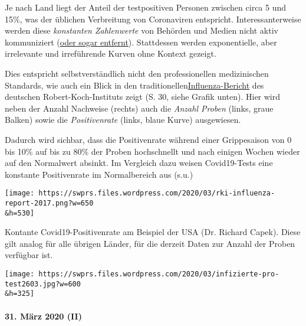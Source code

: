 Je nach Land liegt der Anteil der testpositiven Personen zwischen circa
5 und 15\%, was der üblichen Verbreitung von Coronaviren entspricht.
Interessanterweise werden diese \emph{konstanten Zahlenwerte} von
Behörden und Medien nicht aktiv kommuniziert
(\href{https://multipolar-magazin.de/artikel/coronavirus-irrefuhrung-fallzahlen}{oder
sogar entfernt}). Stattdessen werden exponentielle, aber irrelevante und
irreführende Kurven ohne Kontext gezeigt.

Dies entspricht selbstverständlich nicht den professionellen
medizinischen Standards, wie auch ein Blick in den
traditionellen\href{https://influenza.rki.de/Saisonberichte/2017.pdf}{Influenza-Bericht}
des deutschen Robert-Koch-Instituts zeigt (S. 30, siehe Grafik unten).
Hier wird neben der Anzahl Nachweise (rechts) auch die \emph{Anzahl
Proben} (links, graue Balken) sowie die \emph{Positivenrate} (links,
blaue Kurve) ausgewiesen.

Dadurch wird sichbar, dass die Positivenrate während einer Grippesaison
von 0 bis 10\% auf bis zu 80\% der Proben hochschnellt und nach einigen
Wochen wieder auf den Normalwert absinkt. Im Vergleich dazu weisen
Covid19-Tests eine konstante Positivenrate im Normalbereich aus (s.u.)

\texttt{[image: https://swprs.files.wordpress.com/2020/03/rki-influenza-report-2017.png?w=650\\\&h=530]}

Kontante Covid19-Positivenrate am Beispiel der USA (Dr. Richard Capek).
Diese gilt analog für alle übrigen Länder, für die derzeit Daten zur
Anzahl der Proben verfügbar ist.

\texttt{[image: https://swprs.files.wordpress.com/2020/03/infizierte-pro-test2603.jpg?w=600\\\&h=325]}

\hypertarget{31-muxe4rz-2020-ii}{%
\paragraph{31. März 2020 (II)}\label{31-muxe4rz-2020-ii}}

